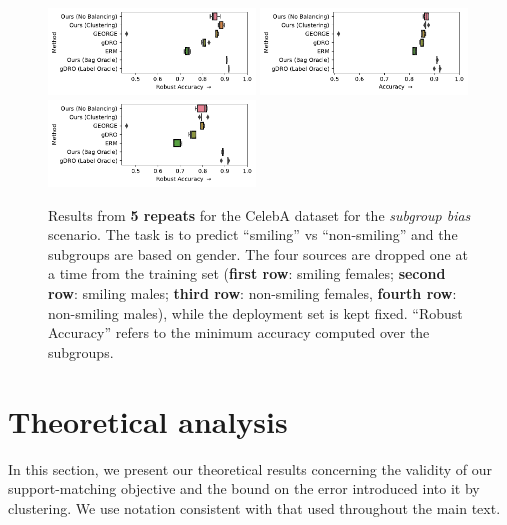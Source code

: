 \begin{figure}[htp]
  \includegraphics[width=0.49\textwidth]{supmatch/figures/celeba/supmat/no_unsmiling_females/celeba_gender_smiling_acc-min.pdf}
 \includegraphics[width=0.49\textwidth]{supmatch/figures/celeba/supmat/no_unsmiling_males/celeba_gender_smiling_acc.pdf}
  \includegraphics[width=0.49\textwidth]{supmatch/figures/celeba/supmat/no_unsmiling_males/celeba_gender_smiling_acc-min.pdf}
\caption{
    Results from \textbf{5 repeats} for the CelebA dataset for the \emph{subgroup bias} scenario.
    The task is to predict ``smiling'' vs ``non-smiling'' and the subgroups are based on gender.
    The four sources are dropped one at a time from the training set
    (\textbf{first row}: smiling females; \textbf{second row}: smiling males; \textbf{third row}:
    non-smiling females, \textbf{fourth row}: non-smiling males), while the deployment set is kept
    fixed. ``Robust Accuracy'' refers to the minimum accuracy computed over the subgroups. 
  }%
 \label{fig:celeba-gender-smiling-full}
\end{figure}

\section{Theoretical analysis}\label{sec:sm-theoretical-analysis}
%
In this section, we present our theoretical results concerning the validity of our support-matching
objective and the bound on the error introduced into it by clustering. 
%
We use notation consistent with that used throughout the main text.

